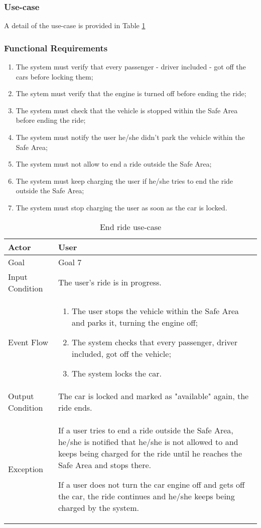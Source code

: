 \subsubsection{Use-case}
A detail of the use-case is provided in Table \ref{end_ride_uc}

\subsubsection{Functional Requirements}
\begin{enumerate}
\item The system must verify that every passenger - driver included - got off the cars before locking them;
\item The sytem must verify that the engine is turned off before ending the ride;
\item The system must check that the vehicle is stopped within the Safe Area before ending the ride;
\item The system must notify the user he/she didn't park the vehicle within the Safe Area;
\item The system must not allow to end a ride outside the Safe Area;
\item The system must keep charging the user if he/she tries to end the ride outside the Safe Area;
\item The system must stop charging the user as soon as the car is locked.
\end{enumerate}

\begin{table}[H]
\begin{center}
\begin{tabular}{p{} | p{}}
\hline
Actor & User\\
\hline
Goal & Goal 7\\
\hline
Input Condition & The user's ride is in progress.\\
\hline
Event Flow & 
\begin{enumerate}
\item The user stops the vehicle within the Safe Area and parks it, turning the engine off;
\item The system checks that every passenger, driver included, got off the vehicle;
\item The system locks the car.
\end{enumerate} \\
\hline
Output Condition & The car is locked and marked as "available" again, the ride ends.\\
\hline
Exception & If a user tries to end a ride outside the Safe Area, he/she is notified that he/she is not allowed to and keeps being charged for the ride until he reaches the Safe Area and stops there.

If a user does not turn the car engine off and gets off the car, the ride continues and he/she keeps being charged by the system.\\
\hline
\end{tabular}
\end{center}
\caption{End ride use-case}
\label{end_ride_uc}
\end{table}
